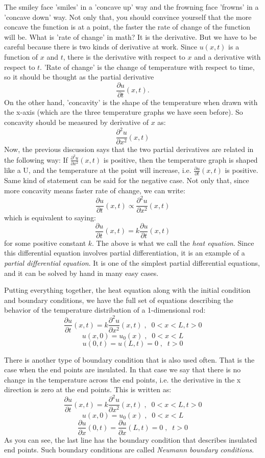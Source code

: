 \documentclass[12pt]{report}
\begin{document}
The smiley face 'smiles' in a 'concave up' way and the frowning face 'frowns' in a 'concave down' way.
Not only that, you should convince yourself that the more concave the function is at a point, the faster the rate of change of the function will be. What is 'rate of change' in math? It is the derivative. But we have to be careful because there is two kinds of derivative at work. Since $u(x,t)$ is a function of $x$ and $t$, there is the derivative with respect to $x$ and a derivative with respect to $t$. 'Rate of change' is the change of temperature with respect to time, so it should be thought as the partial derivative
$$\frac{\partial u}{\partial t}(x,t).$$
On the other hand, 'concavity' is the shape of the temperature when drawn with the x-axis (which are the three temperature graphs we have seen before). So concavity should be measured by derivative of $x$ as:
$$\frac{\partial^2 u}{\partial x^2}(x,t)$$
Now, the previous discussion says that the two partial derivatives are related in the following way: If $\frac{\partial^2 u}{\partial x^2}(x,t)$ is positive, then the temperature graph is shaped like a U, and the temperature at the point will increase, i.e. $\frac{\partial u}{\partial t}(x,t)$ is positive. Same kind of statement can be said for the negative case. Not only that, since more concavity means faster rate of change, we can write:
$$\frac{\partial u}{\partial t} (x,t) \propto \frac{\partial^2 u}{\partial x^2}(x,t)$$
which is equivalent to saying:
$$\frac{\partial u}{\partial t}(x,t) = k \frac{\partial u}{\partial t}(x,t)$$
for some positive constant $k$. The above is what we call the \textit{heat equation}. Since this differential equation involves partial differentiation, it is an example of a \textit{partial differential equation}. It is one of the simplest partial differential equations, and it can be solved by hand in many easy cases.

Putting everything together, the heat equation along with the initial condition and boundary conditions, we have the full set of equations describing the behavior of the temperature distribution of a 1-dimensional rod:
$$\frac{\partial u}{\partial t}(x,t) = k \frac{\partial^2 u}{\partial x^2}(x,t)\; , \; \; 0<x<L, t>0$$
$$u(x,0)=u_0(x)  \; , \; \; 0<x<L$$
$$u(0,t)=u(L,t)=0 \; , \; \; t>0$$

There is another type of boundary condition that is also used often. That is the case when the end points are insulated. In that case we say that there is no change in the temperature across the end points, i.e. the derivative in the x direction is zero at the end points. This is written as:
$$\frac{\partial u}{\partial t}(x,t) = k \frac{\partial^2 u}{\partial x^2}(x,t)\; , \; \; 0<x<L, t>0$$
$$u(x,0)=u_0(x)  \; , \; \; 0<x<L$$
$$\frac{\partial u}{\partial x}(0,t)=\frac{\partial u}{\partial x}(L,t)=0 \; , \; \; t>0$$
As you can see, the last line has the boundary condition that describes insulated end points. Such boundary conditions are called \textit{Neumann boundary conditions}.
\end{document}
